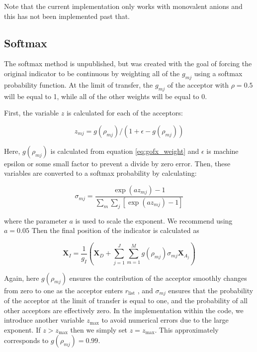 \documentclass{article}
\begin{document}
Note that the current implementation only works with monovalent anions and this has not been implemented past that.

\subsection{Softmax}\label{ss:indicator13}
The softmax method is unpublished, but was created with the goal of forcing the original indicator to be continuous by weighting all of the $g_{mj}$ using a softmax probability function.
At the limit of transfer, the $g_{mj}$ of the acceptor with $\rho = 0.5$ will be equal to 1, while all of the other weights will be equal to 0.

First, the variable $z$ is calculated for each of the acceptors:

\begin{equation}
z_{mj} = g(\rho_{mj}) / (1 + \epsilon - g(\rho_{mj}) )
\end{equation}

Here, $g(\rho_{mj})$ is calculated from equation \ref{eq:gofx_weight} and $\epsilon$ is machine epsilon or some small factor to prevent a divide by zero error.
Then, these variables are converted to a softmax probability by calculating:

\begin{equation}
\sigma_{mj} = \frac{\exp(a z_{mj}) - 1}{\sum_m \sum_j \left[ \exp(a z_{mj}) - 1 \right] }
\end{equation}

where the parameter $a$ is used to scale the exponent.
We recommend using $a = 0.05$
Then the final position of the indicator is calculated as

\begin{equation}\label{eq:softmax-final}
\mathbf{X}_I = \frac{1}{g_I} \left( \mathbf{X}_D + \sum^{J}_{j=1} \sum^{M}_{m=1} g \left( \rho_{mj} \right) \sigma_{mj} \mathbf{X}_{A_j} \right)
\end{equation}

Again, here $g \left( \rho_{mj} \right)$ ensures the contribution of the acceptor smoothly changes from zero to one as the acceptor enters $r_{\mathrm{list}}$ , and $\sigma_{mj}$ ensures that the probability of the acceptor at the limit of transfer is equal to one, and the probability of all other acceptors are effectively zero.
In the implementation within the code, we introduce another variable $z_{\mathrm{max}}$ to avoid numerical errors due to the large exponent.
If $z > z_{\mathrm{max}}$ then we simply set $z = z_{\mathrm{max}}$.
This approximately corresponds to $g(\rho_{mj}) = 0.99$.
\end{document}
